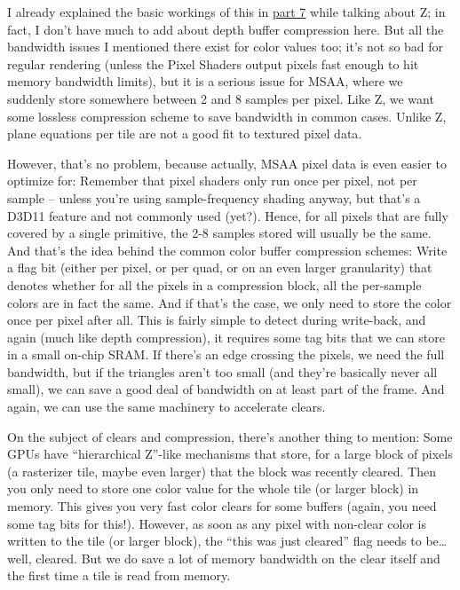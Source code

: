 \documentclass[12pt]{article}
\begin{document}
I already explained the basic workings of this in \hyperref[part7]{part 7} while talking about Z; in fact, I don’t have much to add about depth buffer compression here. But all the bandwidth issues I mentioned there exist for color values too; it’s not so bad for regular rendering (unless the Pixel Shaders output pixels fast enough to hit memory bandwidth limits), but it is a serious issue for MSAA, where we suddenly store somewhere between 2 and 8 samples per pixel. Like Z, we want some lossless compression scheme to save bandwidth in common cases. Unlike Z, plane equations per tile are not a good fit to textured pixel data.

However, that’s no problem, because actually, MSAA pixel data is even easier to optimize for: Remember that pixel shaders only run once per pixel, not per sample – unless you’re using sample-frequency shading anyway, but that’s a D3D11 feature and not commonly used (yet?). Hence, for all pixels that are fully covered by a single primitive, the 2-8 samples stored will usually be the same. And that’s the idea behind the common color buffer compression schemes: Write a flag bit (either per pixel, or per quad, or on an even larger granularity) that denotes whether for all the pixels in a compression block, all the per-sample colors are in fact the same. And if that’s the case, we only need to store the color once per pixel after all. This is fairly simple to detect during write-back, and again (much like depth compression), it requires some tag bits that we can store in a small on-chip SRAM. If there’s an edge crossing the pixels, we need the full bandwidth, but if the triangles aren’t too small (and they’re basically never all small), we can save a good deal of bandwidth on at least part of the frame. And again, we can use the same machinery to accelerate clears.

On the subject of clears and compression, there’s another thing to mention: Some GPUs have “hierarchical Z”-like mechanisms that store, for a large block of pixels (a rasterizer tile, maybe even larger) that the block was recently cleared. Then you only need to store one color value for the whole tile (or larger block) in memory. This gives you very fast color clears for some buffers (again, you need some tag bits for this!). However, as soon as any pixel with non-clear color is written to the tile (or larger block), the “this was just cleared” flag needs to be… well, cleared. But we do save a lot of memory bandwidth on the clear itself and the first time a tile is read from memory.
\end{document}
